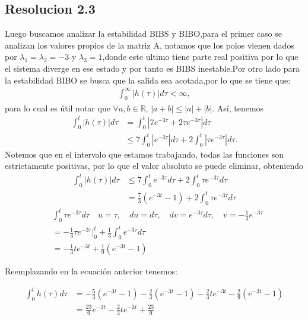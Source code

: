 \documentclass[
  11pt,
  letterpaper,
   addpoints,
  ]{exam}
\begin{document}
\begin{questions}
\begin{solution}
\subsection*{Resolucion 2.3}
Luego buscamos analizar la estabilidad BIBS y BIBO,para el primer caso se analizan los valores propios de la matriz A, notamos que los polos vienen dados por $\lambda_{1}=\lambda_{2}=-3$ y $\lambda_{3}=1$,donde este ultimo tiene parte real positiva por lo que el sistema diverge en ese estado y por tanto es BIBS inestable.Por otro lado para la estabilidad BIBO se busca que la salida sea acotada,por lo que se tiene que:
\begin{align}
    \int_0^\infty |h(\tau)| d\tau < \infty,
    \end{align}
    para lo cual es útil notar que $\forall a,b \in \mathbb{R}$, $|a + b| \leq |a| + |b|$. Así, tenemos
    \begin{align}
    \int_0^t |h(\tau)| d\tau &= \int_0^t |7e^{-3\tau} + 2\tau e^{-3\tau}| d\tau \\
    &\leq 7 \int_0^t |e^{-3\tau}| d\tau + 2 \int_0^t |\tau e^{-3\tau}| d\tau.
    \end{align}
    Notemos que en el intervalo que estamos trabajando, todas las funciones son estrictamente positivas, por lo que el valor absoluto se puede eliminar, obteniendo
    \begin{align}
    \int_0^t |h(\tau)| d\tau &\leq 7 \int_0^t e^{-3\tau} d\tau + 2 \int_0^t \tau e^{-3\tau} d\tau \\
    &=  \frac{7}{3} (e^{-3t} - 1) + 2 \int_0^t \tau e^{-3\tau} d\tau
    \end{align}
\begin{align}
    &\int_0^t \tau e^{-3\tau} d\tau \quad u = \tau, \quad du = d\tau, \quad dv = e^{-3\tau} d\tau, \quad v = -\frac{1}{3} e^{-3\tau} \\
    &= -\frac{1}{3} \tau e^{-3\tau} \Big|_0^t + \frac{1}{3} \int_0^t e^{-3\tau} d\tau \\
      &= -\frac{1}{3} t e^{-3t} + \frac{1}{9} \left( e^{-3t} - 1 \right)
    \end{align}
    
    Reemplazando en la ecuación anterior tenemos:

    \begin{align}
        \int_0^t h(\tau) d\tau &= - \frac{5}{3} \left( e^{-3t} - 1 \right) - \frac{2}{3} \left( e^{-3t} - 1 \right) - \frac{2}{3} t e^{-3t} - \frac{2}{9} \left( e^{-3t} - 1 \right) \\
        &= \frac{23}{9} e^{-3t} - \frac{2}{3} t e^{-3t} + \frac{23}{9}
    \end{align}
        

\end{solution}
\end{questions}
\end{document}
